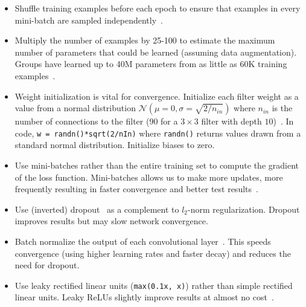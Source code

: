 \begin{itemize}

	\item Shuffle training examples before each epoch to ensure that examples in every mini-batch are sampled independently~\cite{Bengio2012}.

	\item Multiply the number of examples by 25-100 to estimate the maximum number of parameters that could be learned (assuming data augmentation). Groups have learned up to 40M parameters from as little as 60K training examples~\cite{Dieleman2015, Springenberg2014}.

	\item Weight initialization is vital for convergence. Initialize each filter weight as a value from a normal distribution $\mathcal{N}(\mu = 0, \sigma = \sqrt{2/n_{in}})$ where $n_{in}$ is the number of connections to the filter (90 for a $3\times 3$ filter with depth $10$)~\cite{He2015a}. In code, \texttt{w = randn()*sqrt(2/nIn)} where \texttt{randn()} returns values drawn from a standard normal distribution. Initialize biases to zero.

	\item Use mini-batches rather than the entire training set to compute the gradient of the loss function. Mini-batches allows us to make more updates, more frequently resulting in faster convergence and better test results~\cite{Bengio2012}.

	\item Use (inverted) dropout~\cite{Krizhevsky2012} as a complement to $l_2$-norm regularization. Dropout improves results but may slow network convergence.

	\item Batch normalize the output of each convolutional layer~\cite{Ioffe2015}. This speeds convergence (using higher learning rates and faster decay) and reduces the need for dropout. %

	\item Use leaky rectified linear units (\texttt{max(0.1x, x)}) rather than simple rectified linear units. Leaky ReLUs slightly improve results at almost no cost~\cite{Xu2015}.


\end{itemize}
